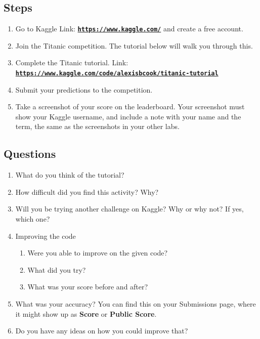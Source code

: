 \documentclass[12pt]{article}
\begin{document}
\subsection*{Steps}
\begin{enumerate}
    \item Go to Kaggle Link: \href{https://www.kaggle.com/}{\textbf{\nolinkurl{https://www.kaggle.com/}}} and create a free account.
    \item Join the Titanic competition. The tutorial below will walk you through this.
    \item Complete the Titanic tutorial. Link: \href{https://www.kaggle.com/code/alexisbcook/titanic-tutorial}{\textbf{\nolinkurl{https://www.kaggle.com/code/alexisbcook/titanic-tutorial}}}
    \item Submit your predictions to the competition.
    \item Take a screenshot of your score on the leaderboard. Your screenshot must show your Kaggle username, and include a note with your name and the term, the same as the screenshots in your other labs.
\end{enumerate}

\subsection*{Questions}
    \begin{enumerate}
        \item What do you think of the tutorial?
        \item How difficult did you find this activity? Why?
        \item Will you be trying another challenge on Kaggle? Why or why not? If yes, which one?
        \item Improving the code
        \begin{enumerate}
            \item Were you able to improve on the given code?
            \item What did you try?
            \item What was your score before and after?
        \end{enumerate}
        \item What was your accuracy? You can find this on your Submissions page, where it might show up as \textbf{Score} or \textbf{Public Score}.
        \item Do you have any ideas on how you could improve that?
    \end{enumerate}
\end{document}
